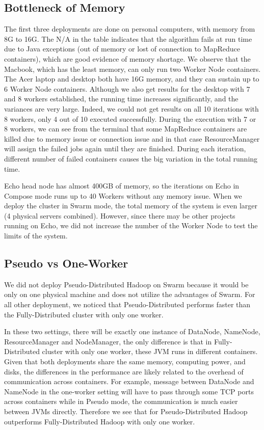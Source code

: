 \subsection{Bottleneck of Memory} 

The first three deployments are done on personal computers, with
memory from 8G to 16G. The N/A in the table indicates that the
algorithm fails at run time due to Java exceptions (out of memory or
lost of connection to MapReduce containers), which are good evidence
of memory shortage. We observe that the Macbook, which has the least
memory, can only run two Worker Node containers. The Acer laptop and
desktop both have 16G memory, and they can sustain up to 6 Worker Node
containers. Although we also get results for the desktop with 7 and 8
workers established, the running time increases significantly, and the
variances are very large. Indeed, we could not get results on all 10
iterations with 8 workers, only 4 out of 10 executed
successfully. During the execution with 7 or 8 workers, we can see
from the terminal that some MapReduce containers are killed due to
memory issue or connection issue and in that case ResourceManager will
assign the failed jobs again until they are finished. During each
iteration, different number of failed containers causes the big
variation in the total running time.

Echo head node has almost 400GB of memory, so the iterations on 
Echo in Compose mode runs up to 40 Workers without any memory issue. 
When we deploy the cluster in Swarm mode, the total memory of the system 
is even larger (4 physical servers combined). However, since there may be 
other projects running on Echo, we did not increase the number of the 
Worker Node to test the limits of the system. 

\subsection{Pseudo vs One-Worker} 

We did not deploy Pseudo-Distributed Hadoop on Swarm because it would 
be only on one physical machine and does not utilize the advantages of 
Swarm. For all other deployment, we noticed that Pseudo-Distributed 
performs faster than the Fully-Distributed cluster with only one worker.

In these two settings, there will be exactly one instance of DataNode,
NameNode, ResourceManager and NodeManager, the only difference is that
in Fully-Distributed cluster with only one worker, these JVM runs in
different containers. Given that both deployments share the same
memory, computing power, and disks, the differences in the performance
are likely related to the overhead of communication across
containers. For example, message between DataNode and NameNode in the
one-worker setting will have to pass through some TCP ports across
containers while in Pseudo mode, the communication is much easier
between JVMs directly. Therefore we see that for Pseudo-Distributed
Hadoop outperforms Fully-Distributed Hadoop with only one worker.

